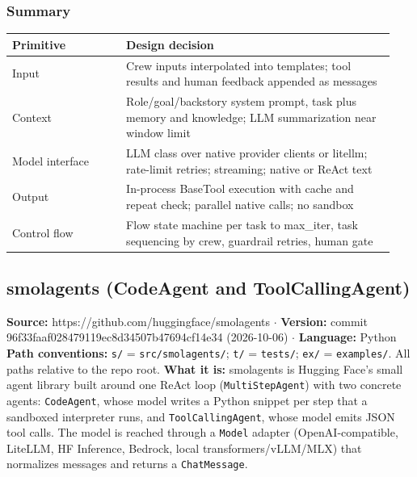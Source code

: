 \subsubsection*{Summary}
\begin{longtable}{@{}p{0.28\linewidth}p{0.66\linewidth}@{}}
\toprule \textbf{Primitive} & \textbf{Design decision} \\ \midrule \endhead
Input & Crew inputs interpolated into templates; tool results and human feedback appended as messages \\
Context & Role/goal/backstory system prompt, task plus memory and knowledge; LLM summarization near window limit \\
Model interface & LLM class over native provider clients or litellm; rate-limit retries; streaming; native or ReAct text \\
Output & In-process BaseTool execution with cache and repeat check; parallel native calls; no sandbox \\
Control flow & Flow state machine per task to max\_iter, task sequencing by crew, guardrail retries, human gate \\
\bottomrule \end{longtable}


\subsection{smolagents (CodeAgent and ToolCallingAgent)}

\textbf{Source:} https://github.com/huggingface/smolagents $\cdot$ \textbf{Version:} commit 96f33faaf028479119ec8d34507b47694cf14e34 (2026-10-06) $\cdot$ \textbf{Language:} Python
\textbf{Path conventions:} \texttt{s/\allowbreak{}} = \texttt{src/\allowbreak{}smolagents/\allowbreak{}}; \texttt{t/\allowbreak{}} = \texttt{tests/\allowbreak{}}; \texttt{ex/\allowbreak{}} = \texttt{examples/\allowbreak{}}. All paths relative to the repo root.
\textbf{What it is:} smolagents is Hugging Face's small agent library built around one ReAct loop (\texttt{MultiStepAgent}) with two concrete agents: \texttt{CodeAgent}, whose model writes a Python snippet per step that a sandboxed interpreter runs, and \texttt{ToolCallingAgent}, whose model emits JSON tool calls. The model is reached through a \texttt{Model} adapter (OpenAI-compatible, LiteLLM, HF Inference, Bedrock, local transformers/vLLM/MLX) that normalizes messages and returns a \texttt{ChatMessage}.

